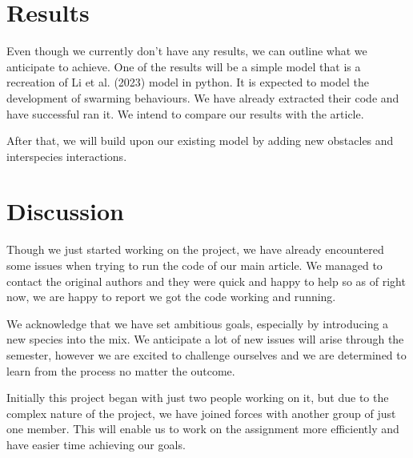 \documentclass[9pt]{pnas-new}
\begin{document}
\section*{Results}
Even though we currently don't have any results, we can outline what we anticipate to achieve. One of the results will be a simple model that is a recreation of Li et al. (2023) model in python. It is expected to model the development of swarming behaviours.  We have already extracted their code and have successful ran it. We intend to compare our results with the article.

After that, we will build upon our existing model by adding new obstacles and interspecies interactions. 

\section*{Discussion}
Though we just started working on the project, we have already encountered some issues when trying to run the code of our main article. We managed to contact the original authors and they were quick and happy to help so as of right now, we are happy to report we got the code working and running. 

We acknowledge that we have set ambitious goals, especially by introducing a new species into the mix. We anticipate a lot of new issues will arise through the semester, however we are excited to challenge ourselves and we are determined to learn from the process no matter the outcome.

Initially this project began with just two people working on it, but due to the complex nature of the project, we have joined forces with another group of just one member. This will enable us to work on the assignment more efficiently and have easier time achieving our goals.


\showacknow %


\begin{multicols}{2}
\end{multicols}
\end{document}
